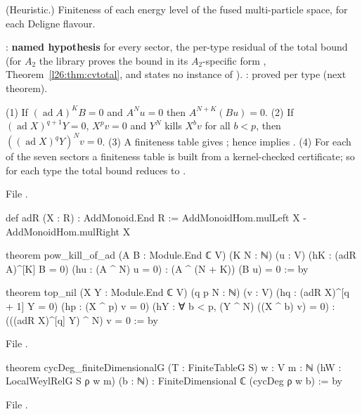 \begin{physics}
(Heuristic.) Finiteness of each energy level of the fused multi-particle space, for each Deligne flavour.
\end{physics}

\begin{status}
: \textbf{named hypothesis} for every sector, the per-type residual of the total bound (for $A_2$
the library proves the bound in its $A_2$-specific form , Theorem~\ref{l26:thm:cvtotal}, and states no
instance of ).
: proved per type (next theorem).
\end{status}

\begin{theorem}\label{l26:thm:finiteG}
(1) If $(\operatorname{ad}A)^KB=0$ and $A^Nu=0$ then $A^{N+K}(Bu)=0$. (2) If $(\operatorname{ad}X)^{q+1}Y=0$, $X^pv=0$ and
$Y^N$ kills $X^bv$ for all $b<p$, then $((\operatorname{ad}X)^qY)^Nv=0$. (3) A finiteness table gives ;
hence  implies . (4) For each of the seven sectors a finiteness table is built from
a kernel-checked certificate; so for each type the total bound reduces to .
\end{theorem}
\noindent File .
\begin{leancode}
def adR (X : R) : AddMonoid.End R := AddMonoidHom.mulLeft X - AddMonoidHom.mulRight X

theorem pow_kill_of_ad (A B : Module.End ℂ V) (K N : ℕ) (u : V) (hK : (adR A)^[K] B = 0)
    (hu : (A ^ N) u = 0) : (A ^ (N + K)) (B u) = 0 := by

theorem top_nil (X Y : Module.End ℂ V) (q p N : ℕ) (v : V) (hq : (adR X)^[q + 1] Y = 0)
    (hp : (X ^ p) v = 0) (hY : ∀ b < p, (Y ^ N) ((X ^ b) v) = 0) :
    (((adR X)^[q] Y) ^ N) v = 0 := by
\end{leancode}
\noindent File .
\begin{leancode}
theorem cycDeg_finiteDimensionalG (T : FiniteTableG S) {w : V} {m : ℕ}
    (hW : LocalWeylRelG S ρ w m) (b : ℕ) : FiniteDimensional ℂ (cycDeg ρ w b) := by
\end{leancode}
\noindent File .
